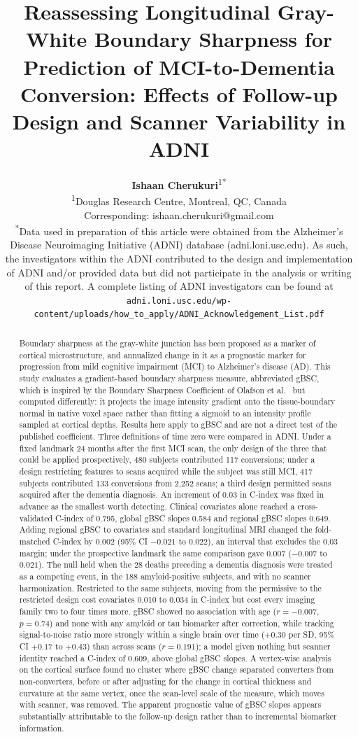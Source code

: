 \documentclass[blue]{ludusofficial}  %
\title{Reassessing Longitudinal Gray-White Boundary Sharpness for Prediction of MCI-to-Dementia Conversion: Effects of Follow-up Design and Scanner Variability in ADNI}
\author{%
    \textbf{Ishaan Cherukuri}\textsuperscript{1}\textsuperscript{*}\\[0.2cm]
    \small\textsuperscript{1}Douglas Research Centre, Montreal, QC, Canada\\
    \small Corresponding: ishaan.cherukuri@gmail.com\\[0.4cm]
    \small\textsuperscript{*}Data used in preparation of this article were obtained from the Alzheimer's Disease Neuroimaging Initiative (ADNI) database (adni.loni.usc.edu). As such, the investigators within the ADNI contributed to the design and implementation of ADNI and/or provided data but did not participate in the analysis or writing of this report. A complete listing of ADNI investigators can be found at \texttt{adni.loni.usc.edu/\allowbreak wp-content/\allowbreak uploads/\allowbreak how\_to\_apply/\allowbreak ADNI\_Acknowledgement\_List.pdf}
}
\begin{document}
\begin{abstract}
Boundary sharpness at the gray-white junction has been proposed as a marker of cortical microstructure, and annualized change in it as a prognostic marker for progression from mild cognitive impairment (MCI) to Alzheimer's disease (AD). This study evaluates a gradient-based boundary sharpness measure, abbreviated gBSC, which is inspired by the Boundary Sharpness Coefficient of Olafson et al.~\cite{olafson2021bsc} but computed differently: it projects the image intensity gradient onto the tissue-boundary normal in native voxel space rather than fitting a sigmoid to an intensity profile sampled at cortical depths. Results here apply to gBSC and are not a direct test of the published coefficient. Three definitions of time zero were compared in ADNI. Under a fixed landmark 24 months after the first MCI scan, the only design of the three that could be applied prospectively, 480 subjects contributed 117 conversions; under a design restricting features to scans acquired while the subject was still MCI, 417 subjects contributed 133 conversions from 2,252 scans; a third design permitted scans acquired after the dementia diagnosis. An increment of 0.03 in C-index was fixed in advance as the smallest worth detecting. Clinical covariates alone reached a cross-validated C-index of 0.795, global gBSC slopes 0.584 and regional gBSC slopes 0.649. Adding regional gBSC to covariates and standard longitudinal MRI changed the fold-matched C-index by 0.002 (95\% CI $-0.021$ to $0.022$), an interval that excludes the 0.03 margin; under the prospective landmark the same comparison gave 0.007 ($-0.007$ to $0.021$). The null held when the 28 deaths preceding a dementia diagnosis were treated as a competing event, in the 188 amyloid-positive subjects, and with no scanner harmonization. Restricted to the same subjects, moving from the permissive to the restricted design cost covariates 0.010 to 0.034 in C-index but cost every imaging family two to four times more. gBSC showed no association with age ($r=-0.007$, $p=0.74$) and none with any amyloid or tau biomarker after correction, while tracking signal-to-noise ratio more strongly within a single brain over time ($+0.30$ per SD, 95\% CI $+0.17$ to $+0.43$) than across scans ($r=0.191$); a model given nothing but scanner identity reached a C-index of 0.609, above global gBSC slopes. A vertex-wise analysis on the cortical surface found no cluster where gBSC change separated converters from non-converters, before or after adjusting for the change in cortical thickness and curvature at the same vertex, once the scan-level scale of the measure, which moves with scanner, was removed. The apparent prognostic value of gBSC slopes appears substantially attributable to the follow-up design rather than to incremental biomarker information.
\end{abstract}
\end{document}
